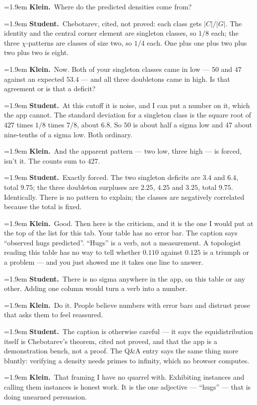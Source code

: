 \documentclass[11pt]{article}
\newcommand{\Stu}[1]{\par\smallskip\noindent\hangindent=1.9em\hangafter=1%
  \textcolor{stucol}{\textbf{Student.}}~#1\par}
\newcommand{\Kle}[1]{\par\smallskip\noindent\hangindent=1.9em\hangafter=1%
  \textcolor{klecol}{\textbf{Klein.}}~#1\par}
\begin{document}
\Kle{Where do the predicted densities come from?}

\Stu{Chebotarev, cited, not proved: each class gets $|C|/|G|$. The identity and the central corner element are singleton classes, so $1/8$ each; the three $\chi$-patterns are classes of size two, so $1/4$ each. One plus one plus two plus two plus two is eight.}

\Kle{Now. Both of your singleton classes came in low --- $50$ and $47$ against an expected $53.4$ --- and all three doubletons came in high. Is that agreement or is that a deficit?}

\Stu{At this cutoff it is noise, and I can put a number on it, which the app cannot. The standard deviation for a singleton class is the square root of $427$ times $1/8$ times $7/8$, about $6.8$. So $50$ is about half a sigma low and $47$ about nine-tenths of a sigma low. Both ordinary.}

\Kle{And the apparent pattern --- two low, three high --- is forced, isn't it. The counts sum to $427$.}

\Stu{Exactly forced. The two singleton deficits are $3.4$ and $6.4$, total $9.75$; the three doubleton surpluses are $2.25$, $4.25$ and $3.25$, total $9.75$. Identically. There is no pattern to explain; the classes are negatively correlated because the total is fixed.}

\Kle{Good. Then here is the criticism, and it is the one I would put at the top of the list for this tab. Your table has no error bar. The caption says ``observed hugs predicted''. ``Hugs'' is a verb, not a measurement. A topologist reading this table has no way to tell whether $0.110$ against $0.125$ is a triumph or a problem --- and you just showed me it takes one line to answer.}

\Stu{There is no sigma anywhere in the app, on this table or any other. Adding one column would turn a verb into a number.}

\Kle{Do it. People believe numbers with error bars and distrust prose that asks them to feel reassured.}

\Stu{The caption is otherwise careful --- it says the equidistribution itself is Chebotarev's theorem, cited not proved, and that the app is a demonstration bench, not a proof. The Q\&A entry says the same thing more bluntly: verifying a density needs primes to infinity, which no browser computes.}

\Kle{That framing I have no quarrel with. Exhibiting instances and calling them instances is honest work. It is the one adjective --- ``hugs'' --- that is doing unearned persuasion.}
\end{document}
